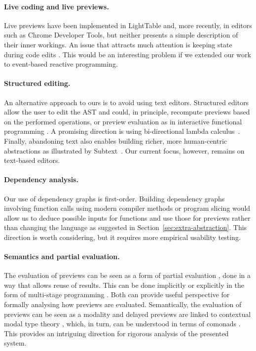 \documentclass[acmsmall,anonymous,fleqn]{acmart}\settopmatter{printfolios=false,printccs=false,printacmref=false}
\theoremstyle{plain}
\theoremstyle{definition}
\begin{document}
\paragraph{Live coding and live previews.}
Live previews have been implemented in LightTable \cite{lighttable} and, more recently, in
editors such as Chrome Developer Tools, but neither presents a simple description of their
inner workings. An issue that attracts much attention is keeping state during code edits
\cite{alive,livingit}. This would be an interesting problem if we extended our work to
event-based reactive programming.

\paragraph{Structured editing.}
An alternative approach to ours is to avoid using text editors. Structured editors
\cite{structure-based} allow the user to edit the AST and could, in principle, recompute previews
based on the performed operations, or preview evaluation as in interactive functional programming
\cite{interactive}. A promising direction is using bi-directional lambda calculus~\cite{hazelnut}.
Finally, abandoning text also enables building richer, more human-centric
abstractions as illustrated by Subtext~\cite{subtext}. Our current focus, however, remains
on text-based editors.

\paragraph{Dependency analysis.}
Our use of dependency graphs \cite{dependencies} is first-order. Building dependency graphs
involving function calls using modern compiler methods \cite{optimizing} or program slicing
\cite{slicing} would allow us to deduce possible inputs for functions and use those for
previews rather than changing the language as suggested in Section~\ref{sec:extra-abstraction}. This direction
is worth considering, but it requires more empirical usability testing.

\paragraph{Semantics and partial evaluation.}
The evaluation of previews can be seen as a form of partial evaluation \cite{partial}, done in a
way that allows reuse of results. This can be done implicitly or explicitly in the form of
multi-stage programming \cite{metaml}. Both can provide useful perspective for formally analysing
how previews are evaluated. Semantically, the evaluation of previews can be seen as a modality
\cite{modal} and delayed previews are linked to contextual modal type theory \cite{cmtt}, which,
in turn, can be understood in terms of comonads \cite{cmtt-denotation}. This provides an intriguing
direction for rigorous analysis of the presented system.
\end{document}
